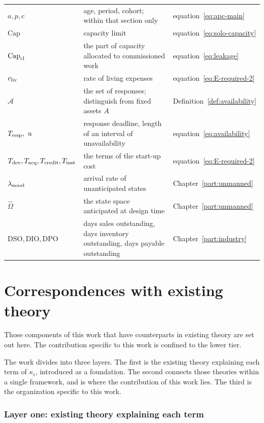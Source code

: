 \begin{longtable}{@{}>{\raggedright\arraybackslash}p{}>{\raggedright\arraybackslash}p{}>{\raggedright\arraybackslash}p{}@{}}
$a,p,c$ & age, period, cohort; within that section only & equation~\eqref{eq:apc-main} \\
$\mathrm{Cap}$ & capacity limit & equation~\eqref{eq:solo-capacity} \\
$\mathrm{Cap}_{\mathrm{cl}}$ & the part of capacity allocated to commissioned work & equation~\eqref{eq:leakage} \\
$c_{\rm liv}$ & rate of living expenses & equation~\eqref{eq:E-required-2} \\
$\mathcal{A}$ & the set of responses; distinguish from fixed assets $A$ & Definition~\ref{def:availability} \\
$T_{\rm resp},\ u$ & response deadline, length of an interval of unavailability & equation~\eqref{eq:availability} \\
$T_{\rm dev},T_{\rm acq},T_{\rm credit},T_{\rm inst}$ & the terms of the start-up cost & equation~\eqref{eq:E-required-2} \\
$\lambda_{\rm novel}$ & arrival rate of unanticipated states & Chapter~\ref{part:unmanned} \\
$\hat\Omega$ & the state space anticipated at design time & Chapter~\ref{part:unmanned} \\
$\mathrm{DSO},\mathrm{DIO},\mathrm{DPO}$ & days sales outstanding, days inventory outstanding, days payable outstanding & Chapter~\ref{part:industry} \\
\end{longtable}

\chapter{Correspondences with existing theory}
\label{app:priorwork}

Those components of this work that have counterparts in existing theory are set out here. The
contribution specific to this work is confined to the lower tier.

The work divides into three layers. The first is the existing theory explaining each term of
$\kappa_i$, introduced as a foundation. The second connects those theories within a single
framework, and is where the contribution of this work lies. The third is the organization
specific to this work.

\subsection*{Layer one: existing theory explaining each term}

